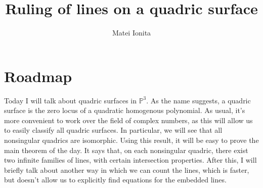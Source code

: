 \documentclass[12 pt]{article}
\title{Ruling of lines on a quadric surface}
\author{Matei Ionita}
\newcommand{\Proj}{\mathbb{P}}
\begin{document}
  \maketitle

\section{Roadmap}
Today I will talk about quadric surfaces in $\Proj^3$. As the name suggests, a quadric surface is the zero locus of a quadratic homogenous
polynomial. As usual, it's more convenient to work over the field of complex numbers, as this will allow us to easily classify all quadric surfaces.
In particular, we will see that all nonsingular quadrics are isomorphic. Using this result, it will be easy to prove the main theorem of the day. It
says that, on each nonsingular quadric, there exist two infinite families of lines, with certain intersection properties. After this, I will briefly talk
about another way in which we can count the lines, which is faster, but doesn't allow us to explicitly find equations for the embedded lines.
\end{document}

